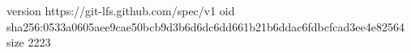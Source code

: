 version https://git-lfs.github.com/spec/v1
oid sha256:0533a0605aee9cae50bcb9d3b6d6dc6dd661b21b6ddac6fdbcfcad3ee4e82564
size 2223
